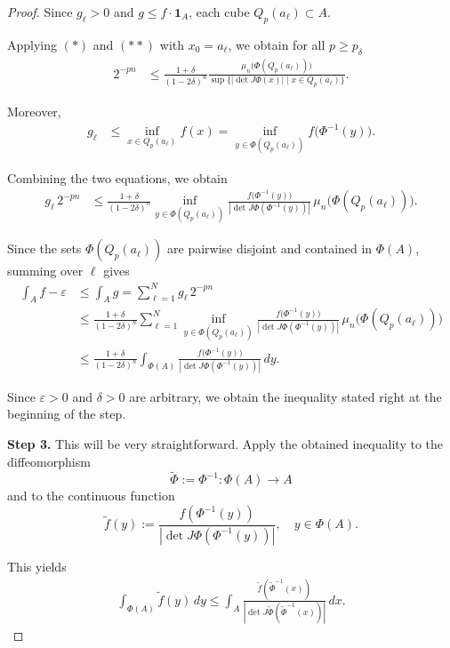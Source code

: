 \begin{proof}
	Since \( g_\ell > 0 \) and \( g \le f \cdot \mathbf{1}_A \), each cube \( Q_p(a_\ell) \subset A \).

	Applying $(*)$ and $(**)$ with \( x_0 = a_\ell \), we obtain for all \( p \ge p_\delta \)
	\begin{align*}
		2^{-pn}
		 & \le \frac{1+\delta}{(1-2\delta)^n}
		\frac{\mu_n\bigl(\Phi(Q_p(a_\ell))\bigr)}{\sup\{ \left|\det J\Phi(x)\right| \mid x \in Q_p(a_\ell) \}}.
	\end{align*}

	Moreover,
	\begin{align*}
		g_\ell & \le \inf_{x \in Q_p(a_\ell)} f(x)
		= \inf_{y \in \Phi(Q_p(a_\ell))} f\bigl(\Phi^{-1}(y)\bigr).
	\end{align*}

	Combining the two equations, we obtain
	\begin{align*}
		g_\ell \, 2^{-pn}
		 & \le \frac{1+\delta}{(1-2\delta)^n}
		\inf_{y \in \Phi(Q_p(a_\ell))}
		\frac{f\bigl(\Phi^{-1}(y)\bigr)}{\left|\det J\Phi(\Phi^{-1}(y))\right|} \,
		\mu_n\bigl(\Phi(Q_p(a_\ell))\bigr).
	\end{align*}

	Since the sets \( \Phi(Q_p(a_\ell)) \) are pairwise disjoint and contained in \( \Phi(A) \), summing over \( \ell \) gives
	\begin{align*}
		\int_A f - \varepsilon
		 & \le \int_{A} g
		= \sum_{\ell=1}^N g_\ell \, 2^{-pn}   \\
		 & \le \frac{1+\delta}{(1-2\delta)^n}
		\sum_{\ell=1}^N \inf_{y \in \Phi(Q_p(a_\ell))}
		\frac{f\bigl(\Phi^{-1}(y)\bigr)}{|\det J\Phi(\Phi^{-1}(y))|} \,
		\mu_n\bigl(\Phi(Q_p(a_\ell))\bigr)    \\
		 & \le \frac{1+\delta}{(1-2\delta)^n}
		\int_{\Phi(A)} \frac{f\bigl(\Phi^{-1}(y)\bigr)}{|\det J\Phi(\Phi^{-1}(y))|} \, dy.
	\end{align*}

	Since \( \varepsilon > 0 \) and \( \delta > 0 \) are arbitrary, we obtain the inequality stated right at the beginning of the step.

	\textbf{Step 3.} This will be very straightforward. Apply the obtained inequality to the diffeomorphism
	\[
		\tilde{\Phi} := \Phi^{-1} : \Phi(A) \to A
	\]
	and to the continuous function
	\[
		\tilde{f}(y) := \frac{f(\Phi^{-1}(y))}{\left|\det J\Phi(\Phi^{-1}(y))\right|},
		\quad y \in \Phi(A).
	\]

	This yields
	\begin{align*}
		\int_{\Phi(A)} \tilde{f}(y) \, dy
		\le \int_A \frac{\tilde{f}(\tilde{\Phi}^{-1}(x))}{\left|\det J\tilde{\Phi}(\tilde{\Phi}^{-1}(x))\right|} \, dx.
	\end{align*}


\end{proof}
